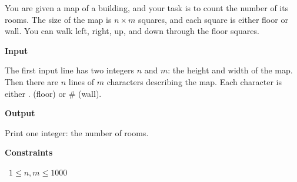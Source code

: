 You are given a map of a building, and your task is to count the number of its rooms. The size of the map is $n \times m$ squares, and each square is either floor or wall. You can walk left, right, up, and down through the floor squares.

\vspace{0.3cm}\noindent\textbf{Input}

The first input line has two integers $n$ and $m$: the height and width of the map.
Then there are $n$ lines of $m$ characters describing the map. Each character is either . (floor) or \# (wall).

\vspace{0.3cm}\noindent\textbf{Output}

Print one integer: the number of rooms.

\vspace{0.3cm}\noindent\textbf{Constraints}

\textbullet\ $1 \le n,m \le 1000$
